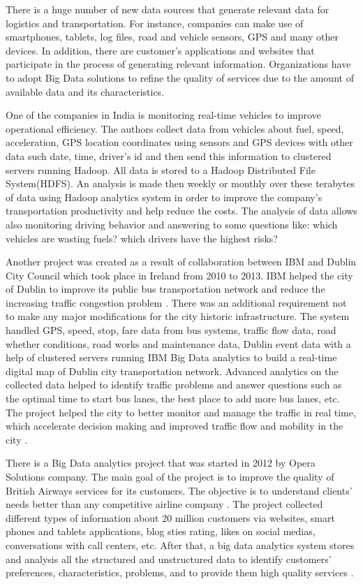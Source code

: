 \documentclass[runningheads]{llncs}
\begin{document}
There is a huge number of new data sources that generate relevant data for logistics and transportation. For instance, companies can make use of smartphones, tablets, log files, road and vehicle sensors, GPS and many other devices. In addition, there are customer's applications and websites that participate in the process of generating relevant information. Organizations have to adopt Big Data solutions to refine the quality of services due to the amount of available data and its characteristics.

One of the companies in India is monitoring real-time vehicles to improve operational efficiency. The authors collect data from vehicles about fuel, speed, acceleration, GPS location coordinates using sensors and GPS devices with other data such date, time, driver's id and then send this information to clustered servers running Hadoop. All data is stored to a Hadoop Distributed File System(HDFS). An analysis is made then weekly or monthly over these terabytes of data using Hadoop analytics system in order to improve the company's transportation productivity and help reduce the costs. The analysis of data allows also monitoring driving behavior and answering to some questions like: which vehicles are wasting fuels? which drivers have the highest risks? \cite{TRANSPORT}

Another project was created as a result of collaboration between IBM and Dublin City Council which took place in Ireland from 2010 to 2013. IBM helped the city of Dublin to improve its public bus transportation network and reduce the increasing traffic congestion problem \cite{TRANSPORTREPORT}. There was an additional requirement not to make any major modifications for the city historic infrastructure. The system handled GPS, speed, stop, fare data from bus systems, traffic flow data, road whether conditions, road works and maintenance data, Dublin event data with a help of clustered servers running IBM Big Data analytics to build a real-time digital map of Dublin city transportation network. Advanced analytics on the collected data helped to identify traffic problems and answer questions such as the optimal time to start bus lanes, the best place to add more bus lanes, etc. The project helped the city to better monitor and manage the traffic in real time, which accelerate decision making and improved traffic flow and mobility in the city \cite{TRANSPORT}. 

There is a Big Data analytics project that was started in 2012 by Opera Solutions company. The main goal of the project is to improve the quality of British Airways services for its customers. The objective is to understand clients' needs better than any competitive airline company \cite{TRANSPORTREPORT}. The project collected different types of information about 20 million customers via websites, smart phones and tablets applications, blog sties rating, likes on social medias, conversations with call centers, etc. After that, a big data analytics system stores and
analysis all the structured and unstructured data to identify customers' preferences, characteristics, problems, and to provide them high quality services \cite{TRANSPORT}. 
\end{document}

